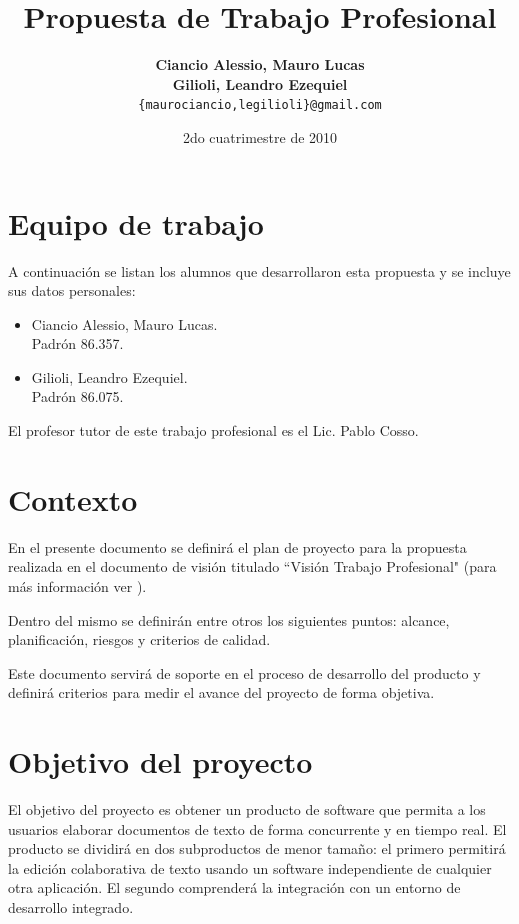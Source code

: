 \documentclass[12pt,a4paper]{article}
\title { \textbf{Propuesta de Trabajo Profesional}}
\date{2do cuatrimestre de 2010}
\author{\textbf{Ciancio Alessio, Mauro Lucas} \\
		\textbf{Gilioli, Leandro Ezequiel}	  \\
		\texttt{\{maurociancio,legilioli\}@gmail.com}
	}
\begin{document}
\maketitle
\tableofcontents
\newpage

	\section{Equipo de trabajo}

A continuación se listan los alumnos que desarrollaron esta propuesta y se incluye sus datos personales:

	\begin{itemize}
		\item Ciancio Alessio, Mauro Lucas. \\
		      Padrón 86.357.
		\item Gilioli, Leandro Ezequiel. \\
		      Padrón 86.075.
	\end{itemize}

El profesor tutor de este trabajo profesional es el Lic. Pablo Cosso.

	\section{Contexto}

	En el presente documento se definirá el plan de proyecto para la propuesta realizada en el documento de visión titulado ``Visión Trabajo Profesional" (para más información ver \cite{visiontpprof}). 

	Dentro del mismo se definirán entre otros los siguientes puntos: alcance, planificación, riesgos y criterios de calidad. 

	Este documento servirá de soporte en el proceso de desarrollo del producto y definirá criterios para medir el avance del proyecto de forma objetiva.	
		
	\section{Objetivo del proyecto}

El objetivo del proyecto es obtener un producto de software que permita a los usuarios elaborar documentos de texto de forma concurrente y en tiempo real. El producto se dividirá en dos subproductos de menor tamaño: el primero permitirá la edición colaborativa de texto usando un software independiente de cualquier otra aplicación. El segundo comprenderá la integración con un entorno de desarrollo integrado.
\end{document}
